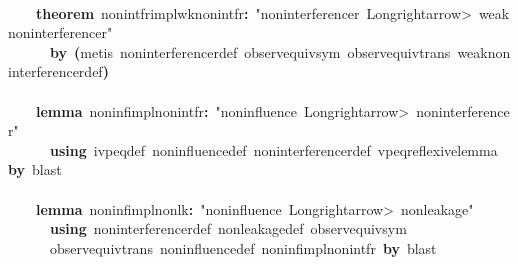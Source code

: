 \documentclass{article}
\newcommand{\syntaxKEYWORDA}[1]{\textcolor[rgb]{0.0,0.4,0.6}{\textbf{#1}}}
\newcommand{\syntaxLITERALA}[1]{\textcolor[rgb]{1.0,0.0,0.8}{#1}}
\newcommand{\syntaxOPERATOR}[1]{\textcolor[rgb]{0.0,0.0,0.0}{\textbf{#1}}}
\newcommand{\syntaxKEYWORDA}[1]{\textcolor[rgb]{0.0,0.4,0.6}{\textbf{#1}}}
\newcommand{\syntaxLITERALA}[1]{\textcolor[rgb]{1.0,0.0,0.8}{#1}}
\newcommand{\syntaxOPERATOR}[1]{\textcolor[rgb]{0.0,0.0,0.0}{\textbf{#1}}}
\newcommand{\syntaxKEYWORDA}[1]{\textcolor[rgb]{0.0,0.4,0.6}{\textbf{#1}}}
\newcommand{\syntaxLITERALA}[1]{\textcolor[rgb]{1.0,0.0,0.8}{#1}}
\newcommand{\syntaxOPERATOR}[1]{\textcolor[rgb]{0.0,0.0,0.0}{\textbf{#1}}}
\newcommand{\syntaxKEYWORDA}[1]{\textcolor[rgb]{0.0,0.4,0.6}{#1}}
\newcommand{\syntaxLITERALA}[1]{\textcolor[rgb]{1.0,0.0,0.8}{\textbf{#1}}}
\newcommand{\syntaxOPERATOR}[1]{\textcolor[rgb]{0.0,0.0,0.0}{#1}}
\newcommand{\syntaxKEYWORDA}[1]{\textcolor[rgb]{0.0,0.4,0.6}{\textbf{#1}}}
\newcommand{\syntaxLITERALA}[1]{\textcolor[rgb]{1.0,0.0,0.8}{#1}}
\newcommand{\syntaxOPERATOR}[1]{\textcolor[rgb]{0.0,0.0,0.0}{\textbf{#1}}}
\newcommand{\syntaxKEYWORDA}[1]{\textcolor[rgb]{0.0,0.4,0.6}{\textbf{#1}}}
\newcommand{\syntaxLITERALA}[1]{\textcolor[rgb]{1.0,0.0,0.8}{#1}}
\newcommand{\syntaxOPERATOR}[1]{\textcolor[rgb]{0.0,0.0,0.0}{\textbf{#1}}}
\begin{document}
\hspace*{\fill}\\
{\ }{\ }{\ }{\ }\syntaxKEYWORDA{theorem}{\ }nonintf\usebox{\underscorebox}r\usebox{\underscorebox}impl\usebox{\underscorebox}wk\usebox{\underscorebox}nonintf\usebox{\underscorebox}r\syntaxOPERATOR{:}{\ }\syntaxLITERALA{"noninterference\usebox{\underscorebox}r{\ }\<Longrightarrow>{\ }weak\usebox{\underscorebox}noninterference\usebox{\underscorebox}r"}\hspace*{\fill}\\
{\ }{\ }{\ }{\ }{\ }{\ }\syntaxKEYWORDA{by}{\ }\syntaxOPERATOR{(}metis{\ }noninterference\usebox{\underscorebox}r\usebox{\underscorebox}def{\ }observ\usebox{\underscorebox}equiv\usebox{\underscorebox}sym{\ }observ\usebox{\underscorebox}equiv\usebox{\underscorebox}trans{\ }weak\usebox{\underscorebox}noninterference\usebox{\underscorebox}r\usebox{\underscorebox}def\syntaxOPERATOR{)}\hspace*{\fill}\\
\hspace*{\fill}\\
{\ }{\ }{\ }{\ }\syntaxKEYWORDA{lemma}{\ }noninf\usebox{\underscorebox}impl\usebox{\underscorebox}nonintf\usebox{\underscorebox}r\syntaxOPERATOR{:}{\ }\syntaxLITERALA{"noninfluence{\ }\<Longrightarrow>{\ }noninterference\usebox{\underscorebox}r"}\hspace*{\fill}\\
{\ }{\ }{\ }{\ }{\ }{\ }\syntaxKEYWORDA{using}{\ }ivpeq\usebox{\underscorebox}def{\ }noninfluence\usebox{\underscorebox}def{\ }noninterference\usebox{\underscorebox}r\usebox{\underscorebox}def{\ }vpeq\usebox{\underscorebox}reflexive\usebox{\underscorebox}lemma{\ }\syntaxKEYWORDA{by}{\ }blast{\ }{\ }{\ }{\ }{\ }{\ }\hspace*{\fill}\\
\hspace*{\fill}\\
{\ }{\ }{\ }{\ }\syntaxKEYWORDA{lemma}{\ }noninf\usebox{\underscorebox}impl\usebox{\underscorebox}nonlk\syntaxOPERATOR{:}{\ }\syntaxLITERALA{"noninfluence{\ }\<Longrightarrow>{\ }nonleakage"}\hspace*{\fill}\\
{\ }{\ }{\ }{\ }{\ }{\ }\syntaxKEYWORDA{using}{\ }noninterference\usebox{\underscorebox}r\usebox{\underscorebox}def{\ }nonleakage\usebox{\underscorebox}def{\ }observ\usebox{\underscorebox}equiv\usebox{\underscorebox}sym{\ }\hspace*{\fill}\\
{\ }{\ }{\ }{\ }{\ }{\ }observ\usebox{\underscorebox}equiv\usebox{\underscorebox}trans{\ }noninfluence\usebox{\underscorebox}def{\ }noninf\usebox{\underscorebox}impl\usebox{\underscorebox}nonintf\usebox{\underscorebox}r{\ }\syntaxKEYWORDA{by}{\ }blast{\ }\hspace*{\fill}\\
\end{document}
